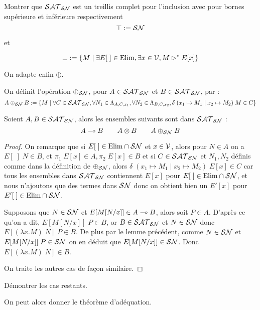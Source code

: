 \begin{exo}
    Montrer que $\mathcal {SAT}_{\mathcal{SN}}$ est un treillis complet pour l'inclusion avec pour bornes supérieure et inférieure respectivement $$\top := \mathcal {SN}$$ \begin{center} et \end{center} $$\bot := \{M\mid \exists E[\;]\in\mathrm{Elim}, \exists x\in\mathcal V, M\rhd^* E[x]\}$$
\end{exo}

On adapte enfin $\oplus$.

\begin{defi}
    On définit l'opération $\oplus_\mathcal {SN}$, pour $A\in\mathcal {SAT}_{\mathcal{SN}}$ et $B\in\mathcal {SAT}_{\mathcal{SN}}$, par : $$A\oplus_\mathcal {SN} B := \{ M \mid \forall C\in\mathcal {SAT}_{\mathcal{SN}},\forall N_1\in\Lambda_{A,C,x_1},\forall N_2\in\Lambda_{B,C,x_2}, \delta\;(x_1\mapsto M_1\mid x_2\mapsto M_2)\;M\in C\}$$
\end{defi}

\begin{lem}
    Soient $A,B\in \mathcal {SAT}_{\mathcal{SN}}$, alors les ensembles suivants sont dans $\mathcal {SAT}_{\mathcal{SN}}$ : $$A\multimap B\qquad A\otimes B\qquad A\oplus_\mathcal {SN} B$$
\end{lem}

\begin{proof}
    On remarque que si $E[\;]\in\mathrm{Elim}\cap\mathcal {SN}$ et $x\in\mathcal V$, alors pour $N\in A$ on a $E[\;]\;N\in B$, et $\pi_1\;E[x]\in A, \pi_2\;E[x]\in B$ et si $C\in \mathcal {SAT}_{\mathcal{SN}}$ et $N_1,N_2$ définis comme dans la définition de $\oplus_\mathcal {SN}$, alors $\delta\;(x_1\mapsto M_1\mid x_2\mapsto M_2)\;E[x]\in C$ car tous les ensembles dans $\mathcal {SAT}_{\mathcal{SN}}$ contiennent $E[x]$ pour $E[\;]\in\mathrm{Elim}\cap\mathcal {SN}$, et nous n'ajoutons que des termes dans $\mathcal {SN}$ donc on obtient bien un $E'[x]$ pour $E'[\;]\in\mathrm{Elim}\cap\mathcal {SN}$.

    Supposons que $N\in\mathcal {SN}$ et $E[M[N/x]]\in A\multimap B$, alors soit $P\in A$. D'après ce qu'on a dit, $E[M[N/x]]\;P\in B$, or $B\in\mathcal {SAT}_{\mathcal{SN}}$ et $N\in\mathcal {SN}$ donc $E[(\lambda x.M)\;N]\;P\in B$. De plus par le lemme précédent, comme $N\in\mathcal {SN}$ et $E[M[N/x]]\;P\in \mathcal {SN}$ on en déduit que $E[M[N/x]]\in\mathcal {SN}$. Donc $E[(\lambda x.M)\;N]\in B$.
    
    On traite les autres cas de façon similaire.
\end{proof}

\begin{exo}
    Démontrer les cas restants.
\end{exo}

On peut alors donner le théorème d'adéquation.

